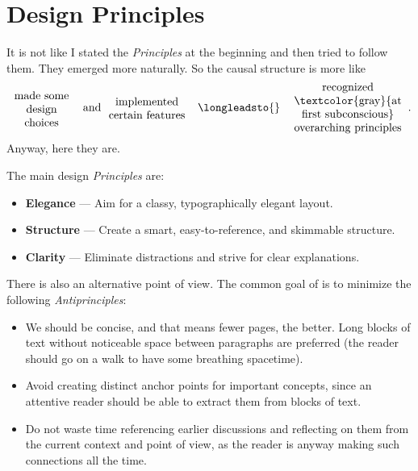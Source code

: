 \chapter{Design Principles}\label{ch:Design}

It is not like I stated the \emph{Principles} at the beginning and then tried to follow them.
They emerged more naturally.
So the causal structure is more like
\[
    \raisebox{-0.15ex}{\parbox[c]{6em}{\centering made some design choices}}
    \mspace{12mu} \text{and} \mspace{10mu}
    \parbox[c]{7em}{\centering implemented certain features}
    \quad\longleadsto{}\quad
    \parbox[c]{10em}{\centering recognized \\\textcolor{gray}{at first subconscious} overarching principles}~.
\]
Anyway, here they are.
\begin{definition} \label{def:Design Principles}
    The main design \emph{Principles} are:
    \begin{itemize}
        \item \textbf{Elegance} --- Aim for a classy, typographically elegant layout.
        \item \textbf{Structure} --- Create a smart, easy-to-reference, and skimmable structure.
        \item \textbf{Clarity} --- Eliminate distractions and strive for clear explanations. \qedhere
    \end{itemize}
\end{definition}
\begin{remark}
    There is also an alternative point of view.
    The common goal of  is to minimize the following \emph{Antiprinciples}:
    \begin{itemize}
        \item We should be concise, and that means fewer pages, the better.
              Long blocks of text without noticeable space between paragraphs are preferred (the reader should go on a walk to have some breathing spacetime).
        \item Avoid creating distinct anchor points for important concepts, since an attentive reader should be able to extract them from blocks of text.
        \item Do not waste time referencing earlier discussions and reflecting on them from the current context and point of view, as the reader is anyway making such connections all the time. \qedhere
    \end{itemize}
\end{remark}

